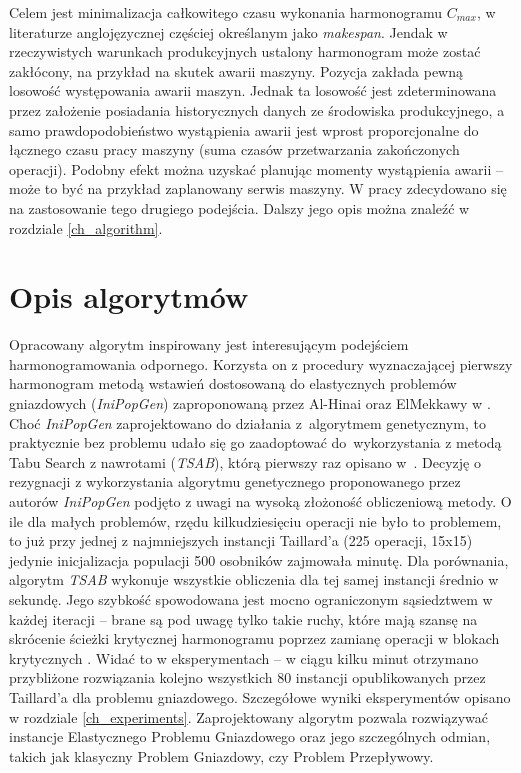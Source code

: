 \documentclass[printmode,oneside]{mgr}
\begin{document}
Celem jest minimalizacja całkowitego czasu wykonania harmonogramu $C_{max}$, w literaturze anglojęzycznej częściej określanym jako \emph{makespan}. Jendak w rzeczywistych warunkach produkcyjnych ustalony harmonogram może zostać zakłócony, na przykład na skutek awarii maszyny. Pozycja \cite{RFJSRMB_ElMekkawy11} zakłada pewną losowość występowania awarii maszyn. Jednak ta losowość jest zdeterminowana przez założenie posiadania historycznych danych ze środowiska produkcyjnego, a samo prawdopodobieństwo wystąpienia awarii jest wprost proporcjonalne do łącznego czasu pracy maszyny (suma czasów przetwarzania zakończonych operacji). Podobny efekt można uzyskać planując momenty wystąpienia awarii -- może to być na przykład zaplanowany serwis maszyny. W pracy zdecydowano się na zastosowanie tego drugiego podejścia. Dalszy jego opis można znaleźć w rozdziale \ref{ch_algorithm}.
%
\chapter{Opis algorytmów \label{ch_algorithm}}
Opracowany algorytm inspirowany jest interesującym podejściem harmonogramowania odpornego. Korzysta on z procedury wyznaczającej pierwszy harmonogram metodą wstawień dostosowaną do elastycznych problemów gniazdowych (\emph{IniPopGen}) zaproponowaną przez Al-Hinai oraz ElMekkawy w \cite{AEHGAFJS_ElMekkawy11}. Choć \emph{IniPopGen} zaprojektowano do działania z~algorytmem genetycznym, to praktycznie bez problemu udało się go zaadoptować do~wykorzystania z metodą Tabu Search z nawrotami (\emph{TSAB}), którą pierwszy raz opisano w~\cite{Smutnicki96}. Decyzję o rezygnacji z wykorzystania algorytmu genetycznego proponowanego przez autorów \emph{IniPopGen} podjęto z uwagi na wysoką złożoność obliczeniową metody. O ile dla małych problemów, rzędu kilkudziesięciu operacji nie było to problemem, to już przy jednej z najmniejszych instancji Taillard'a (225 operacji, 15x15) jedynie inicjalizacja populacji 500 osobników zajmowała minutę. Dla porównania, algorytm \emph{TSAB} wykonuje wszystkie obliczenia dla tej samej instancji średnio w sekundę. Jego szybkość spowodowana jest mocno ograniczonym sąsiedztwem w każdej iteracji -- brane są pod uwagę tylko takie ruchy, które mają szansę na skrócenie ścieżki krytycznej harmonogramu poprzez zamianę operacji w blokach krytycznych \cite{Grabowski86}. Widać to w eksperymentach -- w ciągu kilku minut otrzymano przybliżone rozwiązania kolejno wszystkich 80 instancji opublikowanych przez Taillard'a dla problemu gniazdowego. Szczegółowe wyniki eksperymentów opisano w rozdziale \ref{ch_experiments}. Zaprojektowany algorytm pozwala rozwiązywać instancje Elastycznego Problemu Gniazdowego oraz jego szczególnych odmian, takich jak klasyczny Problem Gniazdowy, czy Problem Przepływowy.
%
\end{document}
